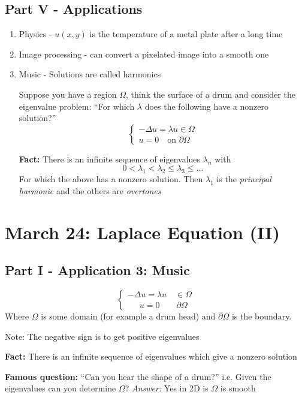 \documentclass[12pt]{article}
\begin{document}
\subsection*{Part V - Applications}
\begin{enumerate}
    \item Physics - $u(x, y)$ is the temperature of a metal plate after a long time
    \item Image processing - can convert a pixelated image into a smooth one
    \item Music - Solutions are called harmonics 
    
    Suppose you have a region $\Omega$, think the surface of a drum and consider the eigenvalue problem: ``For which $\lambda$ does the following have a nonzero solution?''
    \[\begin{cases}
        -\Delta u = \lambda u \in \Omega\\
        u = 0 \quad \text{on } \partial \Omega
    \end{cases}\]

    \textbf{Fact:} There is an infinite sequence of eigenvalues $\lambda_n$ with 
    \[0 < \lambda_1 < \lambda_2 \leq \lambda_3 \leq ...\]
    For which the above has a nonzero solution. Then $\lambda_1$ is the \emph{principal harmonic} and the others are \emph{overtones}
\end{enumerate}

\section{March 24: Laplace Equation (II)}
\subsection*{Part I - Application 3: Music}
\[\begin{cases}
    -\Delta u = \lambda u \quad \in \Omega\\
    \quad \;\, u = 0 \qquad  \partial \Omega 
\end{cases}\]
Where $\Omega$ is some domain (for example a drum head) and $\partial \Omega$ is the boundary.

Note: The negative sign is to get positive eigenvalues

\textbf{Fact:} There is an infinite sequence of eigenvalues which give a nonzero solution 

\textbf{Famous question:} ``Can you hear the shape of a drum?'' i.e. Given the eigenvalues can you determine $\Omega$?
\emph{Answer:} Yes in 2D is $\Omega$ is smooth
\end{document}
